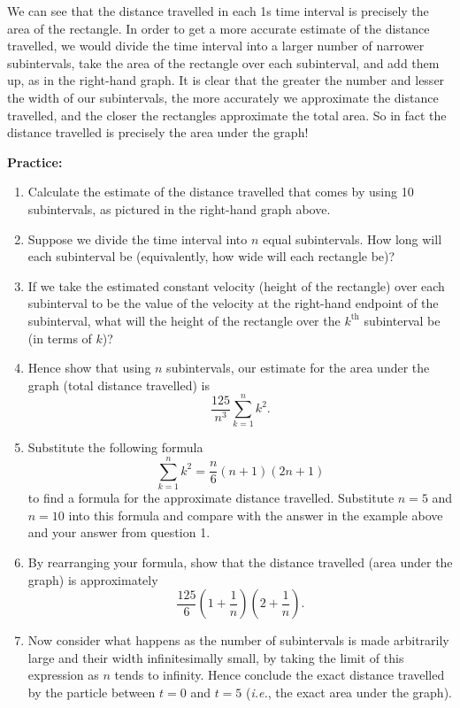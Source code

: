 \documentclass{article}
\begin{document}
We can see that the distance travelled in each 1s time interval is precisely the area of the rectangle. In order to get a more accurate estimate of the distance travelled, we would divide the time interval into a larger number of narrower subintervals, take the area of the rectangle over each subinterval, and add them up, as in the right-hand graph. It is clear that the greater the number and lesser the width of our subintervals, the more accurately we approximate the distance travelled, and the closer the rectangles approximate the total area. So in fact the distance travelled is precisely the area under the graph!

\clearpage













\textbf{Practice:}\bigskip


\begin{enumerate}
	\item Calculate the estimate of the distance travelled that comes by using 10 subintervals, as pictured in the right-hand graph above.
	\item Suppose we divide the time interval into $n$ equal subintervals. How long will each subinterval be (equivalently, how wide will each rectangle be)?
	\item If we take the estimated constant velocity (height of the rectangle) over each subinterval to be the value of the velocity at the right-hand endpoint of the subinterval, what will the height of the rectangle over the $k^\mathrm{th}$ subinterval be (in terms of $k$)?
	\item Hence show that using $n$ subintervals, our estimate for the area under the graph (total distance travelled) is
		\[\frac{125}{n^3}\sum_{k=1}^n k^2.\]
	\item Substitute the following formula
		\[\sum_{k=1}^n k^2=\frac{n}{6}(n+1)(2n+1)\]
		to find a formula for the approximate distance travelled. Substitute $n=5$ and $n=10$ into this formula and compare with the answer in the example above and your answer from question 1.
	\item By rearranging your formula, show that the distance travelled (area under the graph) is approximately
		\[\frac{125}{6}\left(1+\frac{1}{n}\right)\left(2+\frac{1}{n}\right).\]
	\item Now consider what happens as the number of subintervals is made arbitrarily large and their width infinitesimally small, by taking the limit of this expression as $n$ tends to infinity. Hence conclude the exact distance travelled by the particle between $t=0$ and $t=5$ (\textit{i.e.}, the exact area under the graph).
\end{enumerate}
\end{document}
